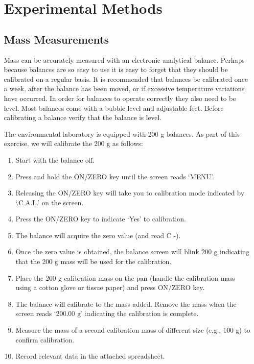 \documentclass[letterpaper,10pt,english]{sphinxmanual}
\begin{document}
\section{Experimental Methods}
\label{\detokenize{Laboratory_Measurements/Laboratory_Measurements:experimental-methods}}\label{\detokenize{Laboratory_Measurements/Laboratory_Measurements:heading-laboratory-measurements-and-procedures-experimental-methods}}

\subsection{Mass Measurements}
\label{\detokenize{Laboratory_Measurements/Laboratory_Measurements:mass-measurements}}
Mass can be accurately measured with an electronic analytical balance. Perhaps because balances are so easy to use it is easy to forget that they should be calibrated on a regular basis. It is recommended that balances be calibrated once a week, after the balance has been moved, or if excessive temperature variations have occurred. In order for balances to operate correctly they also need to be level. Most balances come with a bubble level and adjustable feet. Before calibrating a balance verify that the balance is level.

The environmental laboratory is equipped with 200 g balances.  As part of this exercise, we will calibrate the 200 g as follows:
\begin{enumerate}
\item {} 
Start with the balance off.

\item {} 
Press and hold the ON/ZERO key until the screen reads ‘MENU’.

\item {} 
Releasing the ON/ZERO key will take you to calibration mode indicated by ‘.C.A.L.’ on the screen.

\item {} 
Press the ON/ZERO key to indicate ‘Yes’ to calibration.

\item {} 
The balance will acquire the zero value (and read \textendash{} C -).

\item {} 
Once the zero value is obtained, the balance screen will blink \textendash{} 200 g \textendash{} indicating that the 200 g mass will be used for the calibration.

\item {} 
Place the 200 g calibration mass on the pan (handle the calibration mass using a cotton glove or tissue paper) and press ON/ZERO key.

\item {} 
The balance will calibrate to the mass added. Remove the mass when the screen reads ‘200.00 g’ indicating the calibration is complete.

\item {} 
Measure the mass of a second calibration mass of different size (e.g., 100 g) to confirm calibration.

\item {} 
Record relevant data in the attached spreadsheet.

\end{enumerate}
\end{document}
